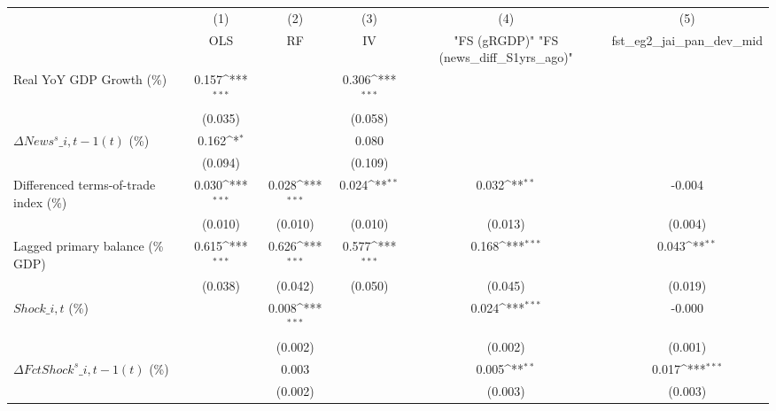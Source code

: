 {
\def\sym#1{\ifmmode^{#1}\else\(^{#1}\)\fi}
\begin{tabular}{l*{5}{c}}
\toprule
                    &\multicolumn{1}{c}{(1)}&\multicolumn{1}{c}{(2)}&\multicolumn{1}{c}{(3)}&\multicolumn{1}{c}{(4)}&\multicolumn{1}{c}{(5)}\\
                    &\multicolumn{1}{c}{OLS}&\multicolumn{1}{c}{RF}&\multicolumn{1}{c}{IV}&\multicolumn{1}{c}{ "FS (gRGDP)"  "FS (news\_diff\_S1yrs\_ago)" }&\multicolumn{1}{c}{fst\_eg2\_jai\_pan\_dev\_mid}\\
\midrule
Real YoY GDP Growth (\%)&       0.157\sym{***}&                     &       0.306\sym{***}&                     &                     \\
                    &     (0.035)         &                     &     (0.058)         &                     &                     \\
\addlinespace
$ \Delta News^s\_{i,t-1}(t)$ (\%)&       0.162\sym{*}  &                     &       0.080         &                     &                     \\
                    &     (0.094)         &                     &     (0.109)         &                     &                     \\
\addlinespace
Differenced terms-of-trade index (\%)&       0.030\sym{***}&       0.028\sym{***}&       0.024\sym{**} &       0.032\sym{**} &      -0.004         \\
                    &     (0.010)         &     (0.010)         &     (0.010)         &     (0.013)         &     (0.004)         \\
\addlinespace
Lagged primary balance (\% GDP)&       0.615\sym{***}&       0.626\sym{***}&       0.577\sym{***}&       0.168\sym{***}&       0.043\sym{**} \\
                    &     (0.038)         &     (0.042)         &     (0.050)         &     (0.045)         &     (0.019)         \\
\addlinespace
$ Shock\_{i,t}$ (\%) &                     &       0.008\sym{***}&                     &       0.024\sym{***}&      -0.000         \\
                    &                     &     (0.002)         &                     &     (0.002)         &     (0.001)         \\
\addlinespace
$ \Delta FctShock^s\_{i,t-1}(t)$ (\%)&                     &       0.003         &                     &       0.005\sym{**} &       0.017\sym{***}\\
                    &                     &     (0.002)         &                     &     (0.003)         &     (0.003)         \\

\end{tabular}}
